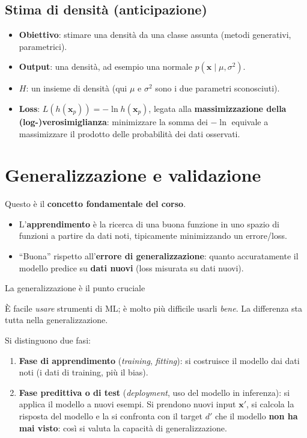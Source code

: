 \subsection{Stima di densità
(anticipazione)}\label{stima-di-densituxe0-anticipazione}

\begin{itemize}
\tightlist
\item
  \textbf{Obiettivo}: stimare una densità da una classe assunta (metodi
  generativi, parametrici).
\item
  \textbf{Output}: una densità, ad esempio una normale
  \(p(\mathbf{x} \mid \mu, \sigma^2)\).
\item
  \textbf{\(H\)}: un insieme di densità (qui \(\mu\) e \(\sigma^2\) sono
  i due parametri sconosciuti).
\item
  \textbf{Loss}: \(L(h(\mathbf{x}_p)) = -\ln h(\mathbf{x}_p)\), legata
  alla \textbf{massimizzazione della (log-)verosimiglianza}: minimizzare
  la somma dei \(-\ln\) equivale a massimizzare il prodotto delle
  probabilità dei dati osservati.
\end{itemize}

\section{Generalizzazione e
validazione}\label{generalizzazione-e-validazione}

Questo è il \textbf{concetto fondamentale del corso}.

\begin{itemize}
\tightlist
\item
  L'\textbf{apprendimento} è la ricerca di una buona funzione in uno
  spazio di funzioni a partire da dati noti, tipicamente minimizzando un
  errore/loss.
\item
  ``Buona'' rispetto all'\textbf{errore di generalizzazione}: quanto
  accuratamente il modello predice su \textbf{dati nuovi} (loss misurata
  su dati nuovi).
\end{itemize}

\begin{boxwarning}{La generalizzazione è il punto cruciale}

È facile \emph{usare} strumenti di ML; è molto più difficile usarli
\emph{bene}. La differenza sta tutta nella generalizzazione.

\end{boxwarning}

Si distinguono due fasi:

\begin{enumerate}
\def\labelenumi{\arabic{enumi}.}
\tightlist
\item
  \textbf{Fase di apprendimento} (\emph{training}, \emph{fitting}): si
  costruisce il modello dai dati noti (i dati di training, più il bias).
\item
  \textbf{Fase predittiva o di test} (\emph{deployment}, uso del modello
  in inferenza): si applica il modello a nuovi esempi. Si prendono nuovi
  input \(\mathbf{x}'\), si calcola la risposta del modello e la si
  confronta con il target \(d'\) che il modello \textbf{non ha mai
  visto}: così si valuta la capacità di generalizzazione.
\end{enumerate}


